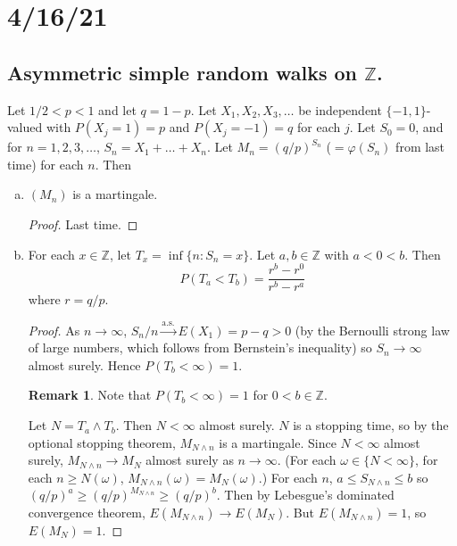 \documentclass{article}
\newcommand{\Z}{\mathbb{Z}}
\theoremstyle{definition}
\newtheorem*{remark}{Remark}
\begin{document}
\section*{4/16/21}

\subsection*{Asymmetric simple random walks on $\Z$.}
Let $1/2 < p < 1$ and let $q = 1 - p$. Let $X_1, X_2, X_3, \dots$ be independent $\{-1, 1\}$-valued with $P(X_j = 1) = p$ and $P(X_j = -1) = q$ for each $j$. Let $S_0 = 0$, and for $n = 1, 2, 3, \dots$, $S_n = X_1 + \dots + X_n$. Let $M_n = (q/p)^{S_n}$ ($= \varphi(S_n)$ from last time) for each $n$. Then
\begin{enumerate}[(a)]
    \item $(M_n)$ is a martingale.
    \begin{proof} Last time. \end{proof}
    \item For each $x \in \Z$, let $T_x = \inf\{n : S_n = x\}$. Let $a, b \in \Z$ with $a < 0 < b$. Then
    \[
        P(T_a < T_b) = \frac{r^b - r^0}{r^b - r^a}
    \]
    where $r = q/p$.
    \begin{proof}
        As $n \to \infty$, $S_n/n \xrightarrow{\text{a.s.}} E(X_1) = p - q > 0$ (by the Bernoulli strong law of large numbers, which follows from Bernstein's inequality) so $S_n \to \infty$ almost surely. Hence $P(T_b < \infty) = 1$.
        \begin{remark}
        Note that $P(T_b < \infty) = 1$ for $0 < b \in \Z$.
        \end{remark}
        Let $N = T_a \wedge T_b$. Then $N < \infty$ almost surely. $N$ is a stopping time, so by the optional stopping theorem, $M_{N \wedge n}$ is a martingale. Since $N < \infty$ almost surely, $M_{N \wedge n} \to M_N$ almost surely as $n \to \infty$. (For each $\omega \in \{N < \infty\}$, for each $n \geq N(\omega)$, $M_{N \wedge n}(\omega) = M_N(\omega)$.) For each $n$, $a \leq S_{N \wedge n} \leq b$ so $(q/p)^a \geq (q/p)^{M_{N \wedge n}} \geq (q/p)^b$. Then by Lebesgue's dominated convergence theorem, $E(M_{N \wedge n}) \to E(M_N)$. But $E(M_{N \wedge n}) = 1$, so $E(M_N) = 1$.
        

\end{proof}
\end{enumerate}
\end{document}
